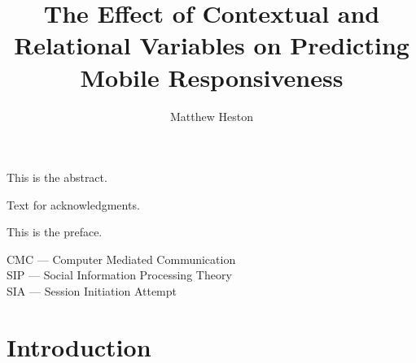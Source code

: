 \documentclass[12pt]{nuthesis}	%
\author{Matthew Heston}
\title{The Effect of Contextual and Relational Variables on Predicting Mobile Responsiveness}
\begin{document}
%	
%


\frontmatter		%

\maketitle		%

\copyrightpage		%


\abstract		%

This is the abstract.

\acknowledgements	%

Text for acknowledgments.

\preface		%

This is the preface.


%
\listofabbreviations
CMC --- Computer Mediated Communication \\
SIP --- Social Information Processing Theory \\
SIA --- Session Initiation Attempt
%
%
%
%
%
%
%

\clearpage{} %
\tableofcontents	%

\clearpage{} %
\listoftables		%

\clearpage{} %
\listoffigures		%



\mainmatter             %



\chapter{Introduction}
\end{document}
